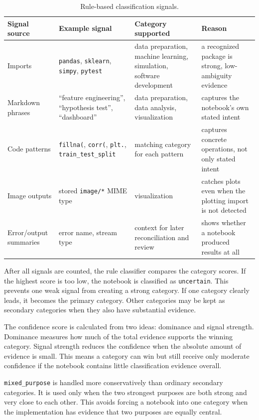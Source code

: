 \begin{table}[ht]
\centering
\caption{Rule-based classification signals.}
\label{tab:rule-signals}
\small
\begin{tabularx}{\textwidth}{@{}p{2.6cm}p{3.0cm}p{2.6cm}X@{}}
\toprule
Signal source & Example signal & Category supported & Reason\tabularnewline
\midrule
Imports & \texttt{pandas}, \texttt{sklearn}, \texttt{simpy}, \texttt{pytest} & data preparation, machine learning, simulation, software development & a recognized package is strong, low-ambiguity evidence\tabularnewline
Markdown phrases & ``feature engineering'', ``hypothesis test'', ``dashboard'' & data preparation, data analysis, visualization & captures the notebook's own stated intent\tabularnewline
Code patterns & \texttt{fillna(}, \texttt{corr(}, \texttt{plt.}, \texttt{train\_test\_split} & matching category for each pattern & captures concrete operations, not only stated intent\tabularnewline
Image outputs & stored \texttt{image/*} MIME type & visualization & catches plots even when the plotting import is not detected\tabularnewline
Error/output summaries & error name, stream type & context for later reconciliation and review & shows whether a notebook produced results at all\tabularnewline
\bottomrule
\end{tabularx}
\end{table}

After all signals are counted, the rule classifier compares the category scores. If the highest score is too low, the notebook is classified as \texttt{uncertain}. This prevents one weak signal from creating a strong category. If one category clearly leads, it becomes the primary category. Other categories may be kept as secondary categories when they also have substantial evidence.

The confidence score is calculated from two ideas: dominance and signal strength. Dominance measures how much of the total evidence supports the winning category. Signal strength reduces the confidence when the absolute amount of evidence is small. This means a category can win but still receive only moderate confidence if the notebook contains little classification evidence overall.

\texttt{mixed\_purpose} is handled more conservatively than ordinary secondary categories. It is used only when the two strongest purposes are both strong and very close to each other. This avoids forcing a notebook into one category when the implementation has evidence that two purposes are equally central.

